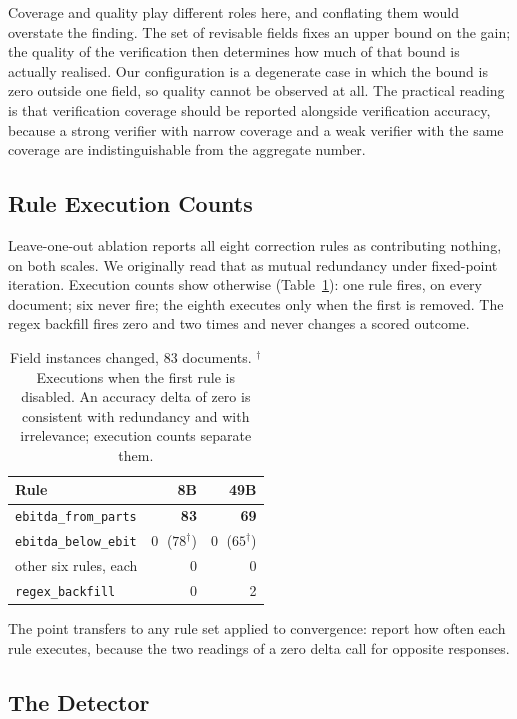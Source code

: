 \documentclass[11pt]{article}
\newcommand{\best}[1]{\textbf{#1}}
\newcommand{\code}[1]{\texttt{\small #1}}
\begin{document}
Coverage and quality play different roles here, and conflating them would overstate the
finding. The set of revisable fields fixes an upper bound on the gain; the quality of the
verification then determines how much of that bound is actually realised. Our
configuration is a degenerate case in which the bound is zero outside one field, so
quality cannot be observed at all. The practical reading is that verification coverage
should be reported alongside verification accuracy, because a strong verifier with narrow
coverage and a weak verifier with the same coverage are indistinguishable from the
aggregate number.

\subsection{Rule Execution Counts}

Leave-one-out ablation reports all eight correction rules as contributing nothing, on
both scales. We originally read that as mutual redundancy under fixed-point iteration.
Execution counts show otherwise (Table~\ref{tab:fires}): one rule fires, on every
document; six never fire; the eighth executes only when the first is removed. The regex
backfill fires zero and two times and never changes a scored outcome.

\begin{table}[t]
\centering\small
\begin{tabular}{@{}lrr@{}}
\toprule
\textbf{Rule} & \textbf{8B} & \textbf{49B} \\
\midrule
\code{ebitda\_from\_parts}       & \best{83} & \best{69} \\
\code{ebitda\_below\_ebit}       & 0 $\;$($78^{\dagger}$) & 0 $\;$($65^{\dagger}$) \\
other six rules, each            & 0 & 0 \\
\code{regex\_backfill}           & 0 & 2 \\
\bottomrule
\end{tabular}
\caption{Field instances changed, $83$ documents. $^{\dagger}$Executions when the first
rule is disabled. An accuracy delta of zero is consistent with redundancy and with
irrelevance; execution counts separate them.}
\label{tab:fires}
\end{table}

The point transfers to any rule set applied to convergence: report how often each rule
executes, because the two readings of a zero delta call for opposite responses.

\subsection{The Detector}
\end{document}
